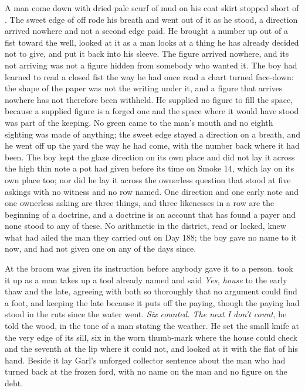A man come down  with dried pale scurf of mud on his coat skirt stopped short of . The sweet edge of  off  rode his breath and went out of it as he stood, a direction arrived nowhere and not a second edge paid. He brought a number up out of a fist toward the well, looked at it as a man looks at a thing he has already decided not to give, and put it back into his sleeve. The figure arrived nowhere, and its not arriving was not a figure hidden from somebody who wanted it. The boy had learned to read a closed fist the way he had once read a chart turned face-down: the shape of the paper was not the writing under it, and a figure that arrives nowhere has not therefore been withheld. He supplied no figure to fill the space, because a supplied figure is a forged one and the space where it would have stood was part of the keeping. No green came to the man's mouth and no eighth sighting was made of anything; the sweet edge stayed a direction on a breath, and he went off up the yard the way he had come, with the number back where it had been. The boy kept the glaze direction on its own place and did not lay it across the high thin note a pot had given before its time on Smoke 14, which lay on its own place too; nor did he lay it across the ownerless question that stood at five askings with no witness and no row named. One direction and one early note and one ownerless asking are three things, and three likenesses in a row are the beginning of a doctrine, and a doctrine is an account that has found a payer and none stood to any of these. No arithmetic in the district, read or locked, knew what had ailed the man they carried out on Day 188; the boy gave no name to it now, and had not given one on any of the days since.

\scenebreak

At  the broom was given its instruction before anybody gave it to a person.  took it up as a man takes up a tool already named and said \emph{Yes, house} to the early thaw and the late, agreeing with both so thoroughly that no argument could find a foot, and keeping the late because it puts off the paying, though the paying had stood in the ruts since the water went. \emph{Six counted. The next I don't count}, he told the wood, in the tone of a man stating the weather. He set the small knife at the very edge of its sill, six in the worn thumb-mark where the house could check and the seventh at the lip where it could not, and looked at it with the flat of his hand. Beside it lay Garl's unforged collector sentence about the man who had turned back at the frozen ford, with no name on the man and no figure on the debt.

